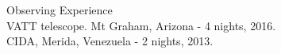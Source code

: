 \documentclass[UTF8]{article}
\begin{document}
{\Large Observing Experience}\\

\indent\indent VATT telescope. Mt Graham, Arizona - 4 nights, 2016.\\
\indent\indent CIDA, Merida, Venezuela - 2 nights, 2013.\\




\end{document}
